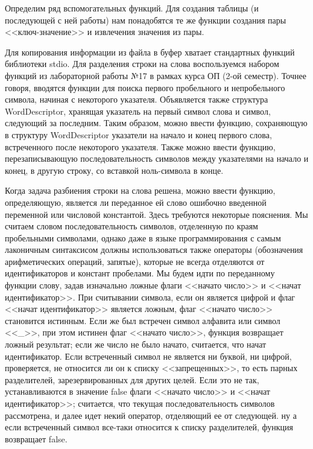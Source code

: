 \documentclass[12pt]{article}
\begin{document}
{	Определим ряд вспомогательных функций. Для создания таблицы (и последующей с ней работы) нам понадобятся те же функции создания пары <<ключ-значение>> и извлечения значения из пары.
	
	 
	
	Для копирования информации из файла в буфер хватает стандартных функций библиотеки stdio. Для разделения строки  на слова воспользуемся набором функций из лабораторной работы №17 в рамках курса ОП (2-ой семестр). Точнее говоря, вводятся функции для поиска первого пробельного и непробельного символа, начиная с некоторого указателя. Объявляется также структура WordDescriptor, хранящая указатель на первый символ слова и символ, следующий за последним. Таким образом, можно ввести функцию, сохраняющую в структуру WordDescriptor указатели на начало и конец первого слова, встреченного после некоторого указателя. Также можно ввести функцию, перезаписывающую последовательность символов между указателями на начало и конец, в другую строку, со вставкой ноль-символа в конце.
	 
	 
	
	Когда задача разбиения строки на слова решена, можно ввести функцию, определяющую, является ли переданное ей слово ошибочно введенной переменной или числовой константой. Здесь требуются некоторые пояснения. Мы считаем словом последовательность символов, отделенную по краям пробельными символами, однако даже в языке программирования с самым лаконичным синтаксисом должны использоваться также операторы (обозначения арифметических операций, запятые), которые не всегда отделяются от идентификаторов и констант пробелами. Мы будем идти по переданному функции слову, задав изначально ложные флаги <<начато число>> и <<начат идентификатор>>. При считывании символа, если он является цифрой и флаг <<начат идентификатор>> является ложным, флаг <<начато число>> становится истинным. Если же был встречен символ алфавита или символ <<\_>>, при этом истинен флаг <<начато число>>, функция возвращает ложный результат; если же число не было начато, считается, что начат идентификатор. Если встреченный символ не является ни буквой, ни цифрой, проверяется, не относится ли он к списку <<запрещенных>>, то есть парных разделителей, зарезервированных для других целей. Если это не так, устанавливаются в значение false  флаги <<начато число>> и <<начат идентификатор>>; считается, что текущая последовательность символов рассмотрена, и далее идет некий оператор, отделяющий ее от следующей. ну а если встреченный символ все-таки относится к списку разделителей, функция возвращает false. 
	
}
\end{document}

